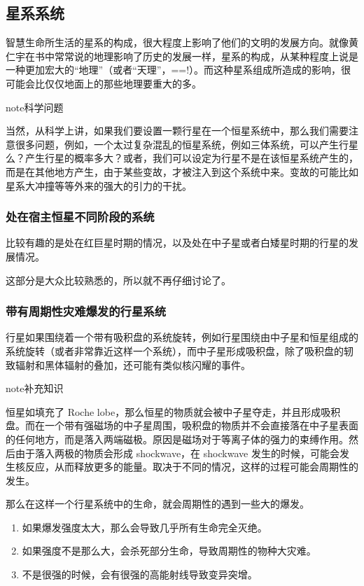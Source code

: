 \documentclass[letterpaper,10pt,english]{sphinxmanual}
\begin{document}
\subsection{星系系统}
\label{astro:id2}
智慧生命所生活的星系的构成，很大程度上影响了他们的文明的发展方向。就像黄仁宇在书中常常说的地理影响了历史的发展一样，星系的构成，从某种程度上说是一种更加宏大的“地理”（或者“天理”，==!）。而这种星系组成所造成的影响，很可能会比仅仅地面上的那些地理要重大的多。

\begin{notice}{note}{科学问题}

当然，从科学上讲，如果我们要设置一颗行星在一个恒星系统中，那么我们需要注意很多问题，例如，一个太过复杂混乱的恒星系统，例如三体系统，可以产生行星么？产生行星的概率多大？或者，我们可以设定为行星不是在该恒星系统产生的，而是在其他地方产生，由于某些变故，才被注入到这个系统中来。变故的可能比如星系大冲撞等等外来的强大的引力的干扰。
\end{notice}


\subsubsection{处在宿主恒星不同阶段的系统}
\label{astro:id3}
比较有趣的是处在红巨星时期的情况，以及处在中子星或者白矮星时期的行星的发展情况。

这部分是大众比较熟悉的，所以就不再仔细讨论了。


\subsubsection{带有周期性灾难爆发的行星系统}
\label{astro:id4}
行星如果围绕着一个带有吸积盘的系统旋转，例如行星围绕由中子星和恒星组成的系统旋转（或者非常靠近这样一个系统），而中子星形成吸积盘，除了吸积盘的轫致辐射和黑体辐射的叠加，还可能有类似核闪耀的事件。

\begin{notice}{note}{补充知识}

恒星如填充了 Roche lobe，那么恒星的物质就会被中子星夺走，并且形成吸积盘。而在一个带有强磁场的中子星周围，吸积盘的物质并不会直接落在中子星表面的任何地方，而是落入两端磁极。原因是磁场对于等离子体的强力的束缚作用。然后由于落入两极的物质会形成 shockwave，在 shockwave 发生的时候，可能会发生核反应，从而释放更多的能量。取决于不同的情况，这样的过程可能会周期性的发生。
\end{notice}

那么在这样一个行星系统中的生命，就会周期性的遇到一些大的爆发。
\begin{enumerate}
\item {} 
如果爆发强度太大，那么会导致几乎所有生命完全灭绝。

\item {} 
如果强度不是那么大，会杀死部分生命，导致周期性的物种大灾难。

\item {} 
不是很强的时候，会有很强的高能射线导致变异突增。

\end{enumerate}
\end{document}
